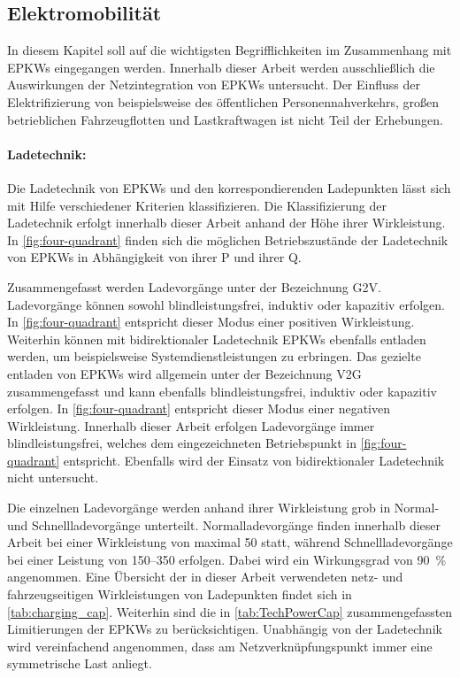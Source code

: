 \subsection{Elektromobilität}

In diesem Kapitel soll auf die wichtigsten Begrifflichkeiten im Zusammenhang mit \glspl{EPKW} eingegangen werden.
Innerhalb dieser Arbeit werden ausschließlich die Auswirkungen der Netzintegration von \glspl{EPKW} untersucht.
Der Einfluss der Elektrifizierung von beispielsweise des öffentlichen Personennahverkehrs, großen betrieblichen Fahrzeugflotten und Lastkraftwagen ist nicht Teil der Erhebungen.


\paragraph{Ladetechnik:}

Die Ladetechnik von \glspl{EPKW} und den korrespondierenden Ladepunkten lässt sich mit Hilfe verschiedener Kriterien klassifizieren.
Die Klassifizierung der Ladetechnik erfolgt innerhalb dieser Arbeit anhand der Höhe ihrer Wirkleistung.
In \autoref{fig:four-quadrant} finden sich die möglichen Betriebszustände der Ladetechnik von \glspl{EPKW} in Abhängigkeit von ihrer \gls{P} und ihrer \gls{Q}.



Zusammengefasst werden Ladevorgänge unter der Bezeichnung \gls{G2V}.
Ladevorgänge können sowohl blindleistungsfrei, induktiv oder kapazitiv erfolgen.
In \autoref{fig:four-quadrant} entspricht dieser Modus einer positiven Wirkleistung.
Weiterhin können mit bidirektionaler Ladetechnik \glspl{EPKW} ebenfalls entladen werden, um beispielsweise Systemdienstleistungen zu erbringen.
Das gezielte entladen von \glspl{EPKW} wird allgemein unter der Bezeichnung \gls{V2G} zusammengefasst und kann ebenfalls blindleistungsfrei, induktiv oder kapazitiv erfolgen.
In \autoref{fig:four-quadrant} entspricht dieser Modus einer negativen Wirkleistung. \cite{He2020} 
Innerhalb dieser Arbeit erfolgen Ladevorgänge immer blindleistungsfrei, welches dem eingezeichneten Betriebspunkt in \autoref{fig:four-quadrant} entspricht.
Ebenfalls wird der Einsatz von bidirektionaler Ladetechnik nicht untersucht.\medskip

Die einzelnen Ladevorgänge werden anhand ihrer Wirkleistung grob in Normal- und Schnellladevorgänge unterteilt.
Normalladevorgänge finden innerhalb dieser Arbeit bei einer Wirkleistung von maximal \SI{50}{\kw} statt, während Schnellladevorgänge bei einer Leistung von \SIrange[range-phrase=~{oder}~]{150}{350}{\kw} erfolgen.
Dabei wird ein Wirkungsgrad von \SI{90}{\percent} \cite{EliaGroup2020} angenommen.
Eine Übersicht der in dieser Arbeit verwendeten netz- und fahrzeugseitigen Wirkleistungen von Ladepunkten findet sich in \autoref{tab:charging_cap}.
Weiterhin sind die in \autoref{tab:TechPowerCap} zusammengefassten Limitierungen der \glspl{EPKW} zu berücksichtigen.
Unabhängig von der Ladetechnik wird vereinfachend angenommen, dass am Netzverknüpfungspunkt immer eine symmetrische Last anliegt.

